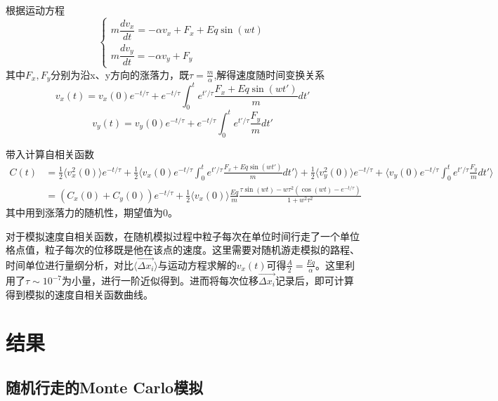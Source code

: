 \documentclass{article}
\begin{document}
根据运动方程
\begin{equation}
	\begin{cases}
		m\dfrac{dv_x}{dt}=-\alpha v_x+F_x+Eq\sin(wt)\\
		m\dfrac{dv_y}{dt}=-\alpha v_y+F_y
	\end{cases}
\end{equation}
其中$ F_x,F_y $分别为沿x、y方向的涨落力，既$ \tau=\frac{m}{\alpha} $,解得速度随时间变换关系
\begin{equation}
	v_x(t)=v_x(0)e^{-t/\tau}+e^{-t/\tau}\int_{0}^{t}e^{t'/\tau}\frac{F_x+Eq\sin(wt')}{m}dt'
\end{equation}
\begin{equation}
	v_y(t)=v_y(0)e^{-t/\tau}+e^{-t/\tau}\int_{0}^{t}e^{t'/\tau}\frac{F_y}{m}dt'
\end{equation}


带入计算自相关函数
\begin{equation}
	\begin{aligned}
	C(t)&=\frac{1}{2}\langle v_x^2(0)\rangle e^{-t/\tau}+\frac{1}{2}\langle v_x(0) e^{-t/\tau}\int_{0}^{t}e^{t'/\tau}\frac{F_x+Eq\sin(wt')}{m}dt'\rangle+\frac{1}{2}\langle v_y^2(0)\rangle e^{-t/\tau}+\langle v_y(0)e^{-t/\tau}\int_{0}^{t}e^{t'/\tau}\frac{F_y}{m}dt'\rangle\\
	&=(C_x(0)+C_y(0))e^{-t/\tau}+\frac{1}{2}\langle v_x(0)\rangle\frac{Eq}{m}\frac{\tau\sin(wt)-w\tau^2(\cos(wt)-e^{-t/\tau})}{1+w^2\tau^2}
	\end{aligned}
\end{equation}
其中用到涨落力的随机性，期望值为0。


对于模拟速度自相关函数，在随机模拟过程中粒子每次在单位时间行走了一个单位格点值，粒子每次的位移既是他在该点的速度。这里需要对随机游走模拟的路程、时间单位进行量纲分析，对比$ \langle \vec{\Delta x_i}\rangle $与运动方程求解的$ v_x(t) $可得$ \frac{A}{2}=\frac{Eq}{\alpha} $。这里利用了$ \tau\sim10^{-7} $为小量，进行一阶近似得到。进而将每次位移$ \vec{\Delta x_i} $记录后，即可计算得到模拟的速度自相关函数曲线。
	\section{结果}
	\subsection{随机行走的Monte Carlo模拟}
	
\end{document}
